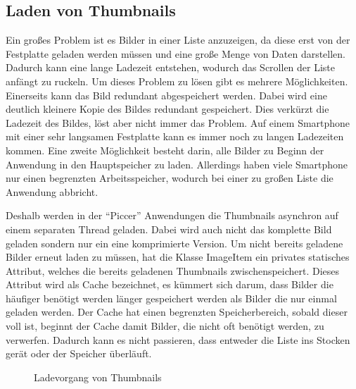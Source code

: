 \subsection{Laden von Thumbnails}
Ein großes Problem ist es Bilder in einer Liste anzuzeigen,
da diese erst von der Festplatte geladen werden müssen und eine große Menge von Daten darstellen.
Dadurch kann eine lange Ladezeit entstehen,
wodurch das Scrollen der Liste anfängt zu ruckeln.
Um dieses Problem zu lösen gibt es mehrere Möglichkeiten.
Einerseits kann das Bild redundant abgespeichert werden.
Dabei wird eine deutlich kleinere Kopie des Bildes redundant gespeichert.
Dies verkürzt die Ladezeit des Bildes, löst aber nicht immer das Problem.
Auf einem Smartphone mit einer sehr langsamen Festplatte kann es immer noch zu langen Ladezeiten kommen.
Eine zweite Möglichkeit besteht darin, alle Bilder zu Beginn der Anwendung in den Hauptspeicher zu laden.
Allerdings haben viele Smartphone nur einen begrenzten Arbeitsspeicher, wodurch bei einer 
zu großen Liste die Anwendung abbricht.

Deshalb werden in der \enquote{Piccer} Anwendungen die Thumbnails asynchron auf einem separaten Thread geladen.
Dabei wird auch nicht das komplette Bild geladen sondern nur ein eine komprimierte Version.
Um nicht bereits geladene Bilder erneut laden zu müssen,
hat die Klasse ImageItem ein privates statisches Attribut, welches die bereits geladenen Thumbnails zwischenspeichert.
Dieses Attribut wird als Cache bezeichnet, es kümmert sich darum, dass Bilder die häufiger 
benötigt werden länger gespeichert werden als Bilder die nur einmal geladen werden.
Der Cache hat einen begrenzten Speicherbereich, sobald dieser voll ist, beginnt der Cache
damit Bilder, die nicht oft benötigt werden, zu verwerfen.
Dadurch kann es nicht passieren, dass entweder die Liste ins Stocken gerät oder der Speicher überläuft.

\begin{figure}[H]
\label{loadThumbnails}
\centering
{}
\caption{Ladevorgang von Thumbnails}
\end{figure}

